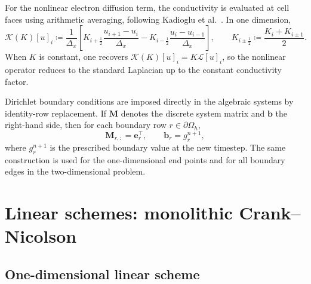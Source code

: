 For the nonlinear electron diffusion term, the conductivity is evaluated at cell faces using arithmetic averaging, following Kadioglu et al.\ \cite{Kadioglu_2008}. In one dimension,
\begin{equation}
    \mathcal{K}(K)[u]_i
    \coloneqq
    \frac{1}{\Delta_x}
    \left[
    K_{i+\frac{1}{2}} \frac{u_{i+1}-u_i}{\Delta_x}
    -
    K_{i-\frac{1}{2}} \frac{u_i-u_{i-1}}{\Delta_x}
    \right],
    \qquad
    K_{i\pm\frac{1}{2}} \coloneqq \frac{K_i + K_{i\pm1}}{2}.
    \label{eq:ch2-flux-divergence}
\end{equation}
When $K$ is constant, one recovers $\mathcal{K}(K)[u]_i = K \mathcal{L}[u]_i$, so the nonlinear operator reduces to the standard Laplacian up to the constant conductivity factor.

Dirichlet boundary conditions are imposed directly in the algebraic systems by identity-row replacement. If $\mathbf{M}$ denotes the discrete system matrix and $\mathbf{b}$ the right-hand side, then for each boundary row $r \in \partial \Omega_h$,
\begin{equation}
    \mathbf{M}_{r,:} = \mathbf{e}_r^\top,
    \qquad
    \mathbf{b}_r = g_r^{n+1},
\end{equation}
where $g_r^{n+1}$ is the prescribed boundary value at the new timestep. The same construction is used for the one-dimensional end points and for all boundary edges in the two-dimensional problem.

\section{Linear schemes: monolithic Crank--Nicolson}
\label{sec:ch2-linear}

\subsection{One-dimensional linear scheme}
\label{sec:ch2-linear-1d}

